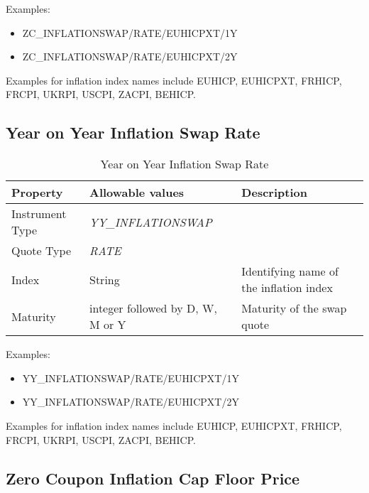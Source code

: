 \medskip
Examples:
\begin{itemize}
\item {ZC\_INFLATIONSWAP/RATE/EUHICPXT/1Y}
\item {ZC\_INFLATIONSWAP/RATE/EUHICPXT/2Y}
\end{itemize}

Examples for inflation index names include EUHICP, EUHICPXT, FRHICP, FRCPI, UKRPI, USCPI, ZACPI, BEHICP.

\subsection{Year on Year Inflation Swap Rate}

\begin{table}[H]
    \centering
    \begin{tabular}{|p{3cm}|p{3.5cm}|p{7cm}|}
      \hline
      {\bf Property} & {\bf Allowable values} & {\bf Description} \\ \hline
      Instrument Type & \emph{YY\_INFLATIONSWAP} & \\ \hline
      Quote Type & \emph{RATE} & \\ \hline
      Index & String & Identifying name of the inflation index \\ \hline
      Maturity & integer followed by D, W, M or Y & Maturity of the swap quote \\ \hline
    \end{tabular}
    \caption{Year on Year Inflation Swap Rate}
    \label{tab:yyinflationswap_quote}
\end{table}

\medskip
Examples:
\begin{itemize}
\item {YY\_INFLATIONSWAP/RATE/EUHICPXT/1Y}
\item {YY\_INFLATIONSWAP/RATE/EUHICPXT/2Y}
\end{itemize}

Examples for inflation index names include EUHICP, EUHICPXT, FRHICP, FRCPI, UKRPI, USCPI, ZACPI, BEHICP.

\subsection{Zero Coupon Inflation Cap Floor Price}

